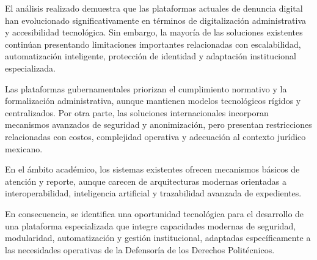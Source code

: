 \begin{flushleft}
\justifying

El análisis realizado demuestra que las plataformas actuales de denuncia digital han evolucionado significativamente en términos de digitalización administrativa y accesibilidad tecnológica. Sin embargo, la mayoría de las soluciones existentes continúan presentando limitaciones importantes relacionadas con escalabilidad, automatización inteligente, protección de identidad y adaptación institucional especializada.

Las plataformas gubernamentales priorizan el cumplimiento normativo y la formalización administrativa, aunque mantienen modelos tecnológicos rígidos y centralizados. Por otra parte, las soluciones internacionales incorporan mecanismos avanzados de seguridad y anonimización, pero presentan restricciones relacionadas con costos, complejidad operativa y adecuación al contexto jurídico mexicano.

En el ámbito académico, los sistemas existentes ofrecen mecanismos básicos de atención y reporte, aunque carecen de arquitecturas modernas orientadas a interoperabilidad, inteligencia artificial y trazabilidad avanzada de expedientes.

En consecuencia, se identifica una oportunidad tecnológica para el desarrollo de una plataforma especializada que integre capacidades modernas de seguridad, modularidad, automatización y gestión institucional, adaptadas específicamente a las necesidades operativas de la Defensoría de los Derechos Politécnicos.

\end{flushleft}